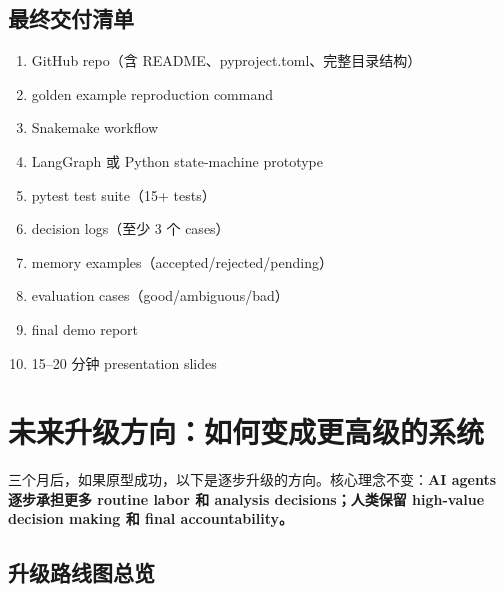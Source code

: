 \documentclass[11pt,a4paper,fontset=fandol]{ctexart}
\begin{document}
\subsection{最终交付清单}

\begin{enumerate}
  \item GitHub repo（含 README、pyproject.toml、完整目录结构）
  \item golden example reproduction command
  \item Snakemake workflow
  \item LangGraph 或 Python state-machine prototype
  \item pytest test suite（15+ tests）
  \item decision logs（至少 3 个 cases）
  \item memory examples（accepted/rejected/pending）
  \item evaluation cases（good/ambiguous/bad）
  \item final demo report
  \item 15--20 分钟 presentation slides
\end{enumerate}

\newpage

\section{未来升级方向：如何变成更高级的系统}

三个月后，如果原型成功，以下是逐步升级的方向。核心理念不变：\textbf{AI agents 逐步承担更多 routine labor 和 analysis decisions；人类保留 high-value decision making 和 final accountability。}

\subsection{升级路线图总览}
\end{document}

